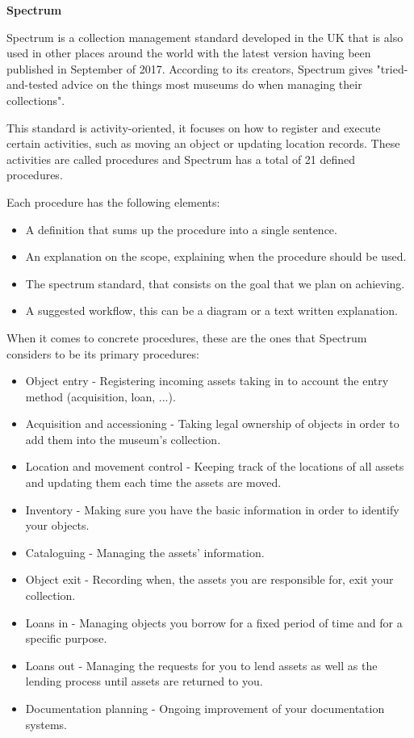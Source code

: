 \vspace{20mm}
\textbf{Spectrum}
\vspace{2mm}

Spectrum\cite{CollectionsTrust2009TheProcedure} is a collection management standard developed in the UK that is also used in other places around the world with the latest version having been published in September of 2017. According to its creators, Spectrum gives "tried-and-tested advice on the things most museums do when managing their collections".


This standard is activity-oriented, it focuses on how to register and execute certain activities, such as moving an object or updating location records. These activities are called procedures and Spectrum has a total of 21 defined procedures.


Each procedure has the following elements:

\begin{itemize}
    \item A definition that sums up the procedure into a single sentence.
    \item An explanation on the scope, explaining when the procedure should be used.
    \item The spectrum standard, that consists on the goal that we plan on achieving.
    \item A suggested workflow, this can be a diagram or a text written explanation.
\end{itemize}

When it comes to concrete procedures, these are the ones that Spectrum \cite{CollectionsTrust2009TheProcedure} considers to be its primary procedures:

\begin{itemize}
    \item Object entry - Registering incoming assets taking in to account the entry method (acquisition, loan, ...).
    \item Acquisition and accessioning - Taking legal ownership of objects in order to add them into the museum's collection.
    \item Location and movement control - Keeping track of the locations of all assets and updating them each time the assets are moved.
    \item Inventory - Making sure you have the basic information in order to identify your objects.
    \item Cataloguing - Managing the assets' information.
    \item Object exit - Recording when, the assets you are responsible for, exit your collection.
    \item Loans in - Managing objects you borrow for a fixed period of time and for a specific purpose.
    \item Loans out - Managing the requests for you to lend assets as well as the lending process until assets are returned to you.
    \item Documentation planning - Ongoing improvement of your documentation systems.
\end{itemize}

